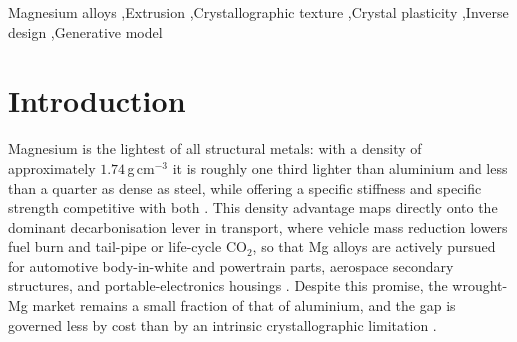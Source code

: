 \documentclass[preprint,12pt]{elsarticle}
\begin{document}
\begin{frontmatter}
\begin{keyword}
Magnesium alloys \sep Extrusion \sep Crystallographic texture \sep Crystal plasticity \sep Inverse design \sep Generative model
\end{keyword}

\end{frontmatter}



\section{Introduction}
\label{sec:intro}

Magnesium is the lightest of all structural metals: with a density of approximately $1.74$\,g\,cm$^{-3}$ it is roughly one third lighter than aluminium and less than a quarter as dense as steel, while offering a specific stiffness and specific strength competitive with both \cite{Mg-lightweighting-review,Joost-Krajewski-2017}. This density advantage maps directly onto the dominant decarbonisation lever in transport, where vehicle mass reduction lowers fuel burn and tail-pipe or life-cycle CO$_2$, so that Mg alloys are actively pursued for automotive body-in-white and powertrain parts, aerospace secondary structures, and portable-electronics housings \cite{Mg-lightweighting-review,Joost-Krajewski-2017,Kim_2013}. Despite this promise, the wrought-Mg market remains a small fraction of that of aluminium, and the gap is governed less by cost than by an intrinsic crystallographic limitation \cite{Agnew_book,Grimes}.
\end{document}
